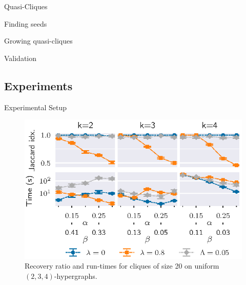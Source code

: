 \documentclass[10pt]{beamer}
\begin{document}
\begin{frame}{Quasi-Cliques}
\end{frame}

\begin{frame}{Finding seeds}
\end{frame}

\begin{frame}{Growing quasi-cliques}
\end{frame}

\begin{frame}{Validation}
\end{frame}

\subsection{Experiments}

\begin{frame}{Experimental Setup}
    
\end{frame}

\begin{frame}{}
\begin{figure}
    \centering
    \includegraphics[width=\textwidth]{quasi_corr_20.eps}
    \caption{
    Recovery ratio and run-times for cliques of size 20 on uniform $(2,3,4)$-hypergraphs.
    }
\end{figure}
\end{frame}
\end{document}
